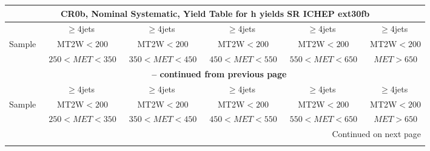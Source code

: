 \documentclass{article}
\begin{document}
\begin{longtable}{|l|c|c|c|c|c|} 
 
\multicolumn{6}{c}{ CR0b, Nominal Systematic, Yield Table for h yields SR ICHEP ext30fb }\\* \hline 
  & $\ge$4jets  & $\ge$4jets  & $\ge$4jets  & $\ge$4jets  & $\ge$4jets \\* 
Sample  & ~MT2W$<200$  & ~MT2W$<200$  & ~MT2W$<200$  & ~MT2W$<200$  & ~MT2W$<200$ \\* 
  & ~$250<MET<350$  & ~$350<MET<450$  & ~$450<MET<550$  & ~$550<MET<650$  & ~$MET>650$ \\* 
\hline \hline 
\endfirsthead 
 
\multicolumn{6}{c}{{\bfseries \tablename\ \thetable{} -- continued from previous page}}\\* \hline 
  & $\ge$4jets  & $\ge$4jets  & $\ge$4jets  & $\ge$4jets  & $\ge$4jets \\* 
Sample  & ~MT2W$<200$  & ~MT2W$<200$  & ~MT2W$<200$  & ~MT2W$<200$  & ~MT2W$<200$ \\* 
  & ~$250<MET<350$  & ~$350<MET<450$  & ~$450<MET<550$  & ~$550<MET<650$  & ~$MET>650$ \\* 
\hline \hline 
\endhead 
 
\multicolumn{6}{|r|}{{Continued on next page}}\\* \hline 
\endfoot 
 
 
\endlastfoot 
 

\end{longtable}
\end{document}
